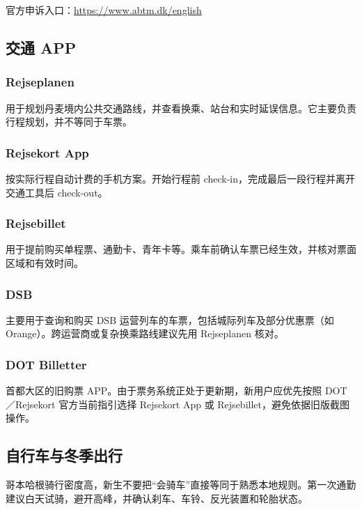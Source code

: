 官方申诉入口：\url{https://www.abtm.dk/english}

\subsection{交通 APP}\label{sec:traffic-app}

\subsubsection{Rejseplanen}
用于规划丹麦境内公共交通路线，并查看换乘、站台和实时延误信息。它主要负责行程规划，并不等同于车票。

\subsubsection{Rejsekort App}
按实际行程自动计费的手机方案。开始行程前 check-in，完成最后一段行程并离开交通工具后 check-out。

\subsubsection{Rejsebillet}
用于提前购买单程票、通勤卡、青年卡等。乘车前确认车票已经生效，并核对票面区域和有效时间。

\subsubsection{DSB}
主要用于查询和购买 DSB 运营列车的车票，包括城际列车及部分优惠票（如 Orange）。跨运营商或复杂换乘路线建议先用 Rejseplanen 核对。

\subsubsection{DOT Billetter}
首都大区的旧购票 APP。由于票务系统正处于更新期，新用户应优先按照 DOT／Rejsekort 官方当前指引选择 Rejsekort App 或 Rejsebillet，避免依据旧版截图操作。

\subsection{自行车与冬季出行}\label{sec:cycling}

哥本哈根骑行密度高，新生不要把“会骑车”直接等同于熟悉本地规则。第一次通勤建议白天试骑，避开高峰，并确认刹车、车铃、反光装置和轮胎状态。


